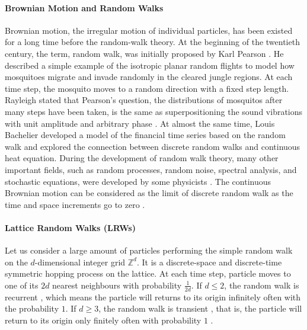 \paragraph{Brownian Motion and Random Walks}

Brownian motion, the irregular motion of individual particles, has been existed for a long time before the random-walk theory. At the beginning of the twentieth century, the term, random walk, was initially proposed by Karl Pearson \cite{pearson1905problem}. He described a simple example of the isotropic planar random flights to model how mosquitoes migrate and invade randomly in the cleared jungle regions. At each time step, the mosquito moves to a random direction with a fixed step length. Rayleigh \cite{rayleigh1905problem} stated that Pearson's question, the distributions of mosquitos after many steps have been taken, is the same as superpositioning the sound vibrations with unit amplitude and arbitrary phase \cite{de2012flying}. At almost the same time, Louis Bachelier \cite{bachelier1900theorie} developed a model of the financial time series based on the random walk and explored the connection between discrete random walks and continuous heat equation. During the development of random
walk theory, many other important fields, such as random processes, random noise, spectral analysis, and stochastic equations, were developed by some physicists \cite{einstein1905electrodynamics} \cite{einstein1906theory} \cite{smoluchowski1916drei}. The continuous Brownian motion can be considered as the limit of discrete random walk as the time and space increments go to zero \cite{lawler2010random}\cite{varadhan1980lectures}.


\paragraph{Lattice Random Walks (LRWs)}

Let us consider a large amount of particles performing the simple random walk on the $d$-dimensional integer grid $\mathbb{Z}^d$. It is a discrete-space and discrete-time symmetric hopping process \cite{redner2001guide} on the lattice. At each time step, particle moves to one of its $2d$ nearest neighbours with probability $\frac{1}{2d}$. If $d \leq 2$, the random walk is recurrent \cite{hughes1998random}, which means the particle will returns to its origin infinitely often with the probability $1$. If $d \geq 3$, the random walk is transient \cite{hughes1998random}, that is, the particle will return to its origin only finitely often with probability $1$ \cite{hughes1998random}.


